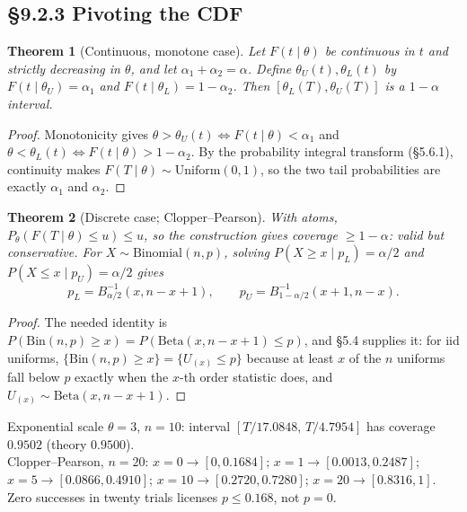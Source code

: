 \documentclass[11pt]{article}
\newtheorem{theorem}{Theorem}[section]
\begin{document}
\subsection{\S9.2.3 Pivoting the CDF}
\begin{theorem}[Continuous, monotone case]
Let $F(t\mid\theta)$ be continuous in $t$ and strictly decreasing in $\theta$, and let $\alpha_1+\alpha_2=\alpha$. Define $\theta_U(t),\theta_L(t)$ by $F(t\mid\theta_U)=\alpha_1$ and $F(t\mid\theta_L)=1-\alpha_2$. Then $[\theta_L(T),\theta_U(T)]$ is a $1-\alpha$ interval.
\end{theorem}
\begin{proof}
Monotonicity gives $\theta>\theta_U(t)\iff F(t\mid\theta)<\alpha_1$ and $\theta<\theta_L(t)\iff F(t\mid\theta)>1-\alpha_2$. By the probability integral transform (\S5.6.1), continuity makes $F(T\mid\theta)\sim\mathrm{Uniform}(0,1)$, so the two tail probabilities are exactly $\alpha_1$ and $\alpha_2$.
\end{proof}
\begin{theorem}[Discrete case; Clopper--Pearson]
With atoms, $P_\theta(F(T\mid\theta)\le u)\le u$, so the construction gives coverage $\ge1-\alpha$: valid but conservative. For $X\sim\mathrm{Binomial}(n,p)$, solving $P(X\ge x\mid p_L)=\alpha/2$ and $P(X\le x\mid p_U)=\alpha/2$ gives
\[p_L=B^{-1}_{\alpha/2}(x,n-x+1),\qquad p_U=B^{-1}_{1-\alpha/2}(x+1,n-x).\]
\end{theorem}
\begin{proof}
The needed identity is $P(\mathrm{Bin}(n,p)\ge x)=P(\mathrm{Beta}(x,n-x+1)\le p)$, and \S5.4 supplies it: for iid uniforms, $\{\mathrm{Bin}(n,p)\ge x\}=\{U_{(x)}\le p\}$ because at least $x$ of the $n$ uniforms fall below $p$ exactly when the $x$-th order statistic does, and $U_{(x)}\sim\mathrm{Beta}(x,n-x+1)$.
\end{proof}
\begin{simbox}
Exponential scale $\theta=3$, $n=10$: interval $[T/17.0848,\,T/4.7954]$ has coverage $0.9502$ (theory $0.9500$).\\
Clopper--Pearson, $n=20$: $x=0\to[0,0.1684]$; $x=1\to[0.0013,0.2487]$; $x=5\to[0.0866,0.4910]$; $x=10\to[0.2720,0.7280]$; $x=20\to[0.8316,1]$. Zero successes in twenty trials licenses $p\le0.168$, not $p=0$.
\end{simbox}
\end{document}
